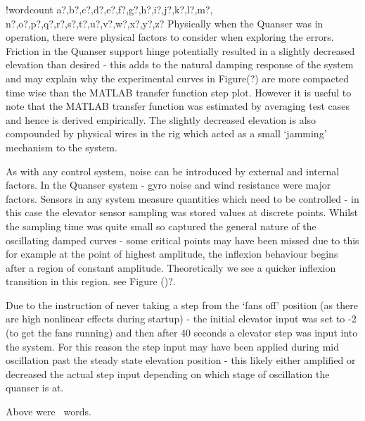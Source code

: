 \documentclass[11pt]{article}
\newcounter{words}
\newenvironment{counted}{%
  \setcounter{words}{0}
  \SearchList!{wordcount}{\stepcounter{words}}
    {a?,b?,c?,d?,e?,f?,g?,h?,i?,j?,k?,l?,m?,
    n?,o?,p?,q?,r?,s?,t?,u?,v?,w?,x?,y?,z?}
  \UndoBoundary{'}
  \SearchOrder{p;}}{%
  \StopSearching}
\begin{document}
\begin{counted}
Physically when the Quanser was in operation, there were physical
factors to consider when exploring the errors. Friction in the Quanser
support hinge potentially resulted in a slightly decreased elevation
than desired - this adds to the natural damping response of the system
and may explain why the experimental curves in Figure(?) are more
compacted time wise than the MATLAB transfer function step plot. However
it is useful to note that the MATLAB transfer function was estimated by
averaging test cases and hence is derived empirically. The slightly
decreased elevation is also compounded by physical wires in the rig
which acted as a small `jamming' mechanism to the system.

As with any control system, noise can be introduced by external and
internal factors. In the Quanser system - gyro noise and wind resistance
were major factors. Sensors in any system measure quantities which need
to be controlled - in this case the elevator sensor sampling was stored
values at discrete points. Whilst the sampling time was quite small so
captured the general nature of the oscillating damped curves - some
critical points may have been missed due to this for example at the
point of highest amplitude, the inflexion behaviour begins after a
region of constant amplitude. Theoretically we see a quicker inflexion
transition in this region. see Figure ()?.

Due to the instruction of never taking a step from the `fans off'
position (as there are high nonlinear effects during startup) - the
initial elevator input was set to -2 (to get the fans running) and then
after 40 seconds a elevator step was input into the system. For this
reason the step input may have been applied during mid oscillation past
the steady state elevation position - this likely either amplified or
decreased the actual step input depending on which stage of oscillation
the quanser is at.

\end{counted} %

\newpage
Above were \thewords\ words. %

% 

\printbibliography
\end{document}
